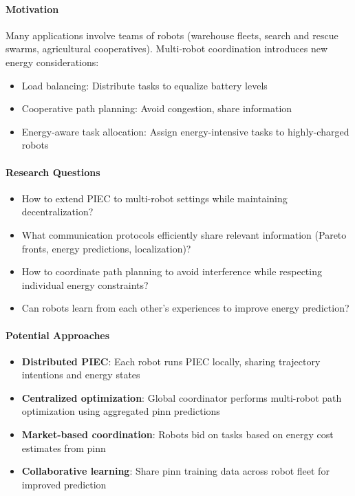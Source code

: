 \paragraph{Motivation}
Many applications involve teams of robots (warehouse fleets, search and rescue swarms, agricultural cooperatives). Multi-robot coordination introduces new energy considerations:
\begin{itemize}
    \item Load balancing: Distribute tasks to equalize battery levels
    \item Cooperative path planning: Avoid congestion, share information
    \item Energy-aware task allocation: Assign energy-intensive tasks to highly-charged robots
\end{itemize}

\paragraph{Research Questions}
\begin{itemize}
    \item How to extend PIEC to multi-robot settings while maintaining decentralization?
    \item What communication protocols efficiently share relevant information (Pareto fronts, energy predictions, localization)?
    \item How to coordinate path planning to avoid interference while respecting individual energy constraints?
    \item Can robots learn from each other's experiences to improve energy prediction?
\end{itemize}

\paragraph{Potential Approaches}
\begin{itemize}
    \item \textbf{Distributed PIEC}: Each robot runs PIEC locally, sharing trajectory intentions and energy states
    \item \textbf{Centralized optimization}: Global coordinator performs multi-robot path optimization using aggregated \acrshort{pinn} predictions
    \item \textbf{Market-based coordination}: Robots bid on tasks based on energy cost estimates from \acrshort{pinn}
    \item \textbf{Collaborative learning}: Share \acrshort{pinn} training data across robot fleet for improved prediction
\end{itemize}

